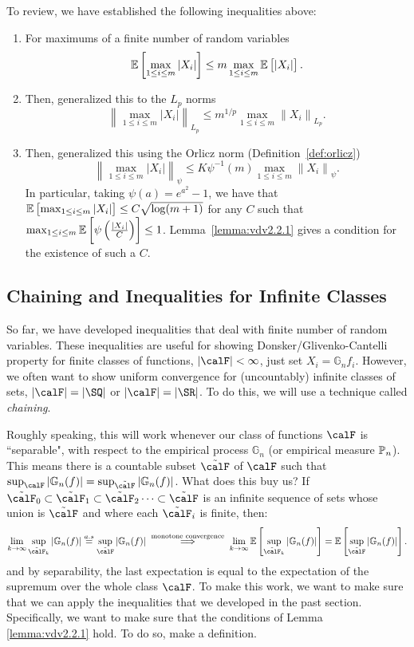To review, we have established the following inequalities above:
\begin{enumerate}
	\item For maximums of a finite number of random variables
	\[
		\E\left[\max_{1\leq i\leq m}\left|X_i\right|\right]\leq m \max_{1\leq i\leq m}\E\left[|X_i|\right]
	.\]
	\item Then, generalized this to the \(L_p\) norms 
	\[
		\left\|\max_{1\leq i\leq m}\left|X_i\right|\right\|_{L_p} \leq m^{1/p}\max_{1\leq i\leq m}\left\|X_i\right\|_{L_p}
	.\]
	\item Then, generalized this using the Orlicz norm (Definition~\ref{def:orlicz})
	\[
		\left\|\max_{1\leq i\leq m}|X_i|\right\|_\psi \leq K\psi^{-1}(m)\max_{1\leq i\leq m}\left\|X_i\right\|_\psi
	.\]
	In particular, taking \(\psi(a) = e^{a^2}-1\), we have that  \(\E\left[\max_{1\leq i\leq m}|X_i|\right] \leq C\sqrt{\log(m+1)}\) for any \(C\) such that  \(\max_{1\leq i\leq m}\E\left[\psi\left(\frac{|X_i|}{C}\right)\right]\leq 1\). Lemma~\ref{lemma:vdv2.2.1} gives a condition for the existence of such a \(C\).
\end{enumerate}


\subsection{Chaining and Inequalities for Infinite Classes}%

So far, we have developed inequalities that deal with finite number of random variables. These inequalities are useful for showing Donsker/Glivenko-Cantelli property for finite classes of functions, \(|\calF|<\infty\), just set \(X_i = \mathbb{G}_nf_i\). However, we often want to show uniform convergence for (uncountably) infinite classes of sets, \(|\calF| = |\SQ|\) or  \(|\calF|=|\SR|\). To do this, we will use a technique called \textit{chaining}. 

Roughly speaking, this will work whenever our class of functions \(\calF\) is ``separable", with respect to the empirical process \(\mathbb{G}_n\) (or empirical measure \(\P_n\)). This means there is a countable subset \(\tilde\calF\) of  \(\calF\)   such that \(\sup_\calF |\mathbb{G}_n(f)| = \sup_{\tilde\calF} |\mathbb{G}_n(f)|\). What does this buy us? If \(\tilde\calF_0\subset\tilde\calF_1\subset\tilde\calF_2 \dots \subset\tilde\calF\) is an infinite sequence of sets whose union is \(\tilde\calF\) and where each \(\tilde\calF_i\) is finite, then:
 \[
	 \lim_{k\to\infty} \sup_{\tilde\calF_k}|\mathbb{G}_n(f)| \overset{a.s}{=} \sup_{\tilde\calF} |\mathbb{G}_n(f)|\; \overset{\text{monotone convergence}}{\implies}\;\lim_{k\to\infty} \E\left[\sup_{\tilde\calF_k}|\mathbb{G}_n(f)|\right]=\E\left[\sup_{\tilde\calF}|\mathbb{G}_n(f)|\right]
.\] 
and by separability, the last expectation is equal to the expectation of the supremum over the whole class \(\calF\). To make this work, we want to make sure that we can apply the inequalities that we developed in the past section. Specifically, we want to make sure that the conditions of Lemma~ \ref{lemma:vdv2.2.1} hold. To do so, make a definition.

